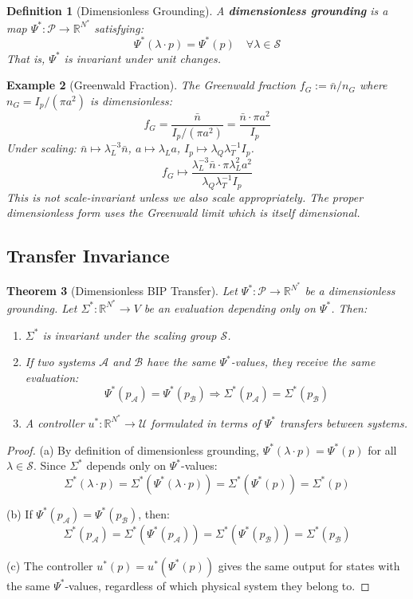\documentclass[11pt]{article}
\newtheorem{theorem}{Theorem}[section]
\newtheorem{definition}[theorem]{Definition}
\newtheorem{example}[theorem]{Example}
\begin{document}
\begin{definition}[Dimensionless Grounding]
A \textbf{dimensionless grounding} is a map $\Psi^* : \mathcal{P} \to
\mathbb{R}^{N^*}$ satisfying:
\[
\Psi^*(\lambda \cdot p) = \Psi^*(p) \quad \forall \lambda \in \mathcal{S}
\]
That is, $\Psi^*$ is invariant under unit changes.
\end{definition}

\begin{example}[Greenwald Fraction]
The Greenwald fraction $f_G := \bar{n}/n_G$ where $n_G = I_p/(\pi a^2)$
is dimensionless:
\[
f_G = \frac{\bar{n}}{I_p/(\pi a^2)} = \frac{\bar{n} \cdot \pi a^2}{I_p}
\]
Under scaling: $\bar{n} \mapsto \lambda_L^{-3}\bar{n}$, $a \mapsto \lambda_L a$, $I_p \mapsto \lambda_Q\lambda_T^{-1}I_p$.
\[
f_G \mapsto \frac{\lambda_L^{-3}\bar{n} \cdot \pi\lambda_L^2 a^2}{\lambda_Q\lambda_T^{-1}I_p}
\]
This is not scale-invariant unless we also scale appropriately. The proper dimensionless form
uses the Greenwald limit which is itself dimensional.
\end{example}

\subsection{Transfer Invariance}

\begin{theorem}[Dimensionless BIP Transfer]
\label{thm:transfer}
Let $\Psi^* : \mathcal{P} \to \mathbb{R}^{N^*}$ be a dimensionless grounding.
Let $\Sigma^* : \mathbb{R}^{N^*} \to V$ be an evaluation depending only on $\Psi^*$. Then:
\begin{enumerate}
    \item[(a)] $\Sigma^*$ is invariant under the scaling group $\mathcal{S}$.
    \item[(b)] If two systems $\mathcal{A}$ and $\mathcal{B}$ have the same $\Psi^*$-values, they receive the same evaluation:
    \[
    \Psi^*(p_{\mathcal{A}}) = \Psi^*(p_{\mathcal{B}}) \Rightarrow \Sigma^*(p_{\mathcal{A}}) = \Sigma^*(p_{\mathcal{B}})
    \]
    \item[(c)] A controller $u^* : \mathbb{R}^{N^*} \to \mathcal{U}$ formulated in terms of $\Psi^*$ transfers between systems.
\end{enumerate}
\end{theorem}

\begin{proof}
(a) By definition of dimensionless grounding, $\Psi^*(\lambda \cdot p) = \Psi^*(p)$ for all $\lambda \in \mathcal{S}$. Since $\Sigma^*$
depends only on $\Psi^*$-values:
\[
\Sigma^*(\lambda \cdot p) = \Sigma^*(\Psi^*(\lambda \cdot p)) = \Sigma^*(\Psi^*(p)) = \Sigma^*(p)
\]

(b) If $\Psi^*(p_{\mathcal{A}}) = \Psi^*(p_{\mathcal{B}})$, then:
\[
\Sigma^*(p_{\mathcal{A}}) = \Sigma^*(\Psi^*(p_{\mathcal{A}})) = \Sigma^*(\Psi^*(p_{\mathcal{B}})) = \Sigma^*(p_{\mathcal{B}})
\]

(c) The controller $u^*(p) = u^*(\Psi^*(p))$ gives the same output for states with the same $\Psi^*$-values, regardless of which physical system they belong to.
\end{proof}
\end{document}
